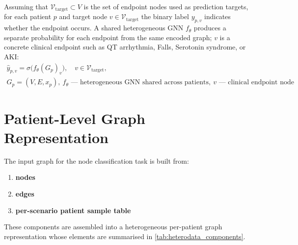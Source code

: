 Assuming that \(\mathcal{V}_{\text{target}} \subset V\) is the set of
endpoint nodes used as prediction targets,
for each patient $p$ and target node $v \in \mathcal{V}_{\text{target}}$
the binary label $y_{p,v}$ indicates whether the endpoint occurs.
A shared heterogeneous GNN $f_\theta$ produces a separate probability for each
endpoint from the same encoded graph; $v$ is a concrete clinical endpoint such
as QT arrhythmia, Falls, Serotonin syndrome, or AKI:
\begin{equation}
\begin{gathered}
\hat{y}_{p,v} = \sigma\big(f_\theta(G_p)_v\big),
\quad v \in \mathcal{V}_{\text{target}}, \\[0.4em]
{\scriptstyle
G_p=(V,E,x_p),\ 
f_\theta\text{ --- heterogeneous GNN shared across patients},\ 
v\text{ --- clinical endpoint node}
}
\end{gathered}
\end{equation} 

\section{Patient-Level Graph Representation}
\label{subsec:taskb_data}

The input graph for the node classification task is built from: 

\begin{enumerate}[label=\alph*)]
    \item \textbf{nodes}
    \item \textbf{edges}
    \item \textbf{per-scenario patient sample table} 
\end{enumerate}

These components are assembled into a heterogeneous per-patient graph representation
 whose elements are summarised in \cref{tab:heterodata_components}.

